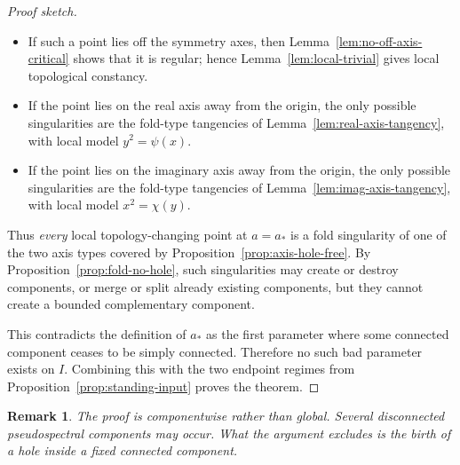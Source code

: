 \documentclass[11pt]{article}
\newtheorem{remark}[theorem]{Remark}
\begin{document}
\begin{proof}[Proof sketch]
\begin{itemize}
\item If such a point lies off the symmetry axes, then Lemma~\ref{lem:no-off-axis-critical} shows that it is regular; hence Lemma~\ref{lem:local-trivial} gives local topological constancy.

\item If the point lies on the real axis away from the origin, the only possible singularities are the fold-type tangencies of Lemma~\ref{lem:real-axis-tangency}, with local model \(y^2=\psi(x)\).

\item If the point lies on the imaginary axis away from the origin, the only possible singularities are the fold-type tangencies of Lemma~\ref{lem:imag-axis-tangency}, with local model \(x^2=\chi(y)\).
\end{itemize}

Thus \emph{every} local topology-changing point at \(a=a_*\) is a fold singularity of one of the two axis types covered by Proposition~\ref{prop:axis-hole-free}. By Proposition~\ref{prop:fold-no-hole}, such singularities may create or destroy components, or merge or split already existing components, but they cannot create a bounded complementary component.

This contradicts the definition of \(a_*\) as the first parameter where some connected component ceases to be simply connected. Therefore no such bad parameter exists on \(I\). Combining this with the two endpoint regimes from Proposition~\ref{prop:standing-input} proves the theorem.
\end{proof}

\begin{remark}
The proof is componentwise rather than global. Several disconnected pseudospectral components may occur. What the argument excludes is the birth of a \emph{hole inside a fixed connected component}.
\end{remark}
\end{document}
